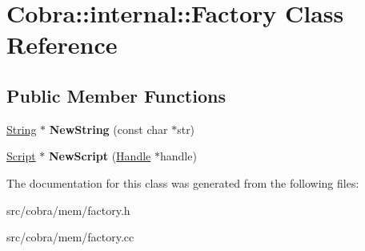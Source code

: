 \hypertarget{class_cobra_1_1internal_1_1_factory}{\section{Cobra\+:\+:internal\+:\+:Factory Class Reference}
\label{class_cobra_1_1internal_1_1_factory}
}
\subsection*{Public Member Functions}
\begin{DoxyCompactItemize}
\item 
\hypertarget{class_cobra_1_1internal_1_1_factory_a8b645b10420d689716ebfb307ff047d1}{\hyperlink{class_cobra_1_1internal_1_1_string}{String} $\ast$ {\bfseries New\+String} (const char $\ast$str)}\label{class_cobra_1_1internal_1_1_factory_a8b645b10420d689716ebfb307ff047d1}

\item 
\hypertarget{class_cobra_1_1internal_1_1_factory_aed7a84a295acae0539dd765e35842f1a}{\hyperlink{class_cobra_1_1internal_1_1_script}{Script} $\ast$ {\bfseries New\+Script} (\hyperlink{class_cobra_1_1internal_1_1_handle}{Handle} $\ast$handle)}\label{class_cobra_1_1internal_1_1_factory_aed7a84a295acae0539dd765e35842f1a}

\end{DoxyCompactItemize}


The documentation for this class was generated from the following files\+:\begin{DoxyCompactItemize}
\item 
src/cobra/mem/factory.\+h\item 
src/cobra/mem/factory.\+cc\end{DoxyCompactItemize}
